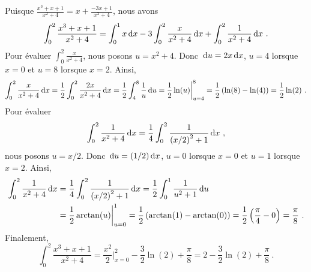 {
Puisque $\displaystyle \frac{x^3+x+1}{x^2+4} = x + \frac{-3x+1}{x^2+4}$,
nous avons
\[
\int_0^2 \frac{x^3+x+1}{x^2+4} = \int_0^1 x \dx{x}
-3 \int_0^2 \frac{x}{x^2+4} \dx{x} + \int_0^2 \frac{1}{x^2+ 4} \dx{x} \ .
\]
Pour évaluer $\displaystyle \int_0^2 \frac{x}{x^2+4}$, nous posons
$u=x^2+4$.  Donc $\,\mathrm{d}u = 2x \,\mathrm{d}x$, $u=4$ lorsque $x=0$ et
$u=8$ lorsque $x=2$.  Ainsi,
\[
\int_0^2 \frac{x}{x^2+4} \,\mathrm{d}x
= \frac{1}{2} \int_0^2 \frac{2x}{x^2+4} \,\mathrm{d}x
= \frac{1}{2} \int_4^8 \frac{1}{u} \,\mathrm{d}u
= \frac{1}{2} \ln(u) \bigg|_{u=4}^8
= \frac{1}{2} \left( \ln(8) - \ln(4) \right)
= \frac{1}{2} \ln(2) \ .
\]
Pour évaluer
\[
\int_0^2 \frac{1}{x^2+ 4} \dx{x}
= \frac{1}{4} \int_0^2 \frac{1}{\left(x/2\right)^2+ 1} \dx{x} \ ,
\]
nous posons $u=x/2$.  Donc $\,\mathrm{d}u = (1/2) \,\mathrm{d}x$, $u=0$ lorsque
$x=0$ et $u=1$ lorsque $x=2$.  Ainsi,
\begin{align*}
\int_0^2 \frac{1}{x^2+ 4} \,\mathrm{d}x
&= \frac{1}{4} \int_0^2 \frac{1}{\left(x/2\right)^2+ 1} \,\mathrm{d}x
= \frac{1}{2} \int_0^1 \frac{1}{u^2+1} \,\mathrm{d}u \\
&= \frac{1}{2} \arctan(u)\bigg|_{u=0}^1
= \frac{1}{2} \left(\arctan(1) - \arctan(0)\right)
= \frac{1}{2}\left( \frac{\pi}{4} - 0 \right)  = \frac{\pi}{8} \ .
\end{align*}
Finalement,
\[
\int_0^2 \frac{x^3+x+1}{x^2+4} = \frac{x^2}{2}\bigg|_{x=0}^2
-\frac{3}{2} \ln(2) + \frac{\pi}{8}
= 2 -\frac{3}{2} \ln(2) + \frac{\pi}{8} \ .
\]
}

